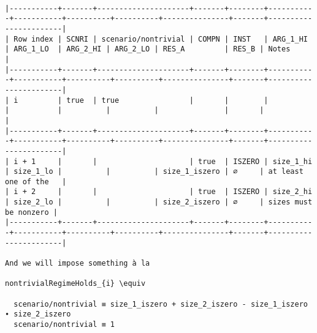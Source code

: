 \documentclass[varwidth=\maxdimen,margin=0.5cm,multi={verbatim}]{standalone}
\begin{document}
\begin{verbatim}

|-----------+-------+---------------------+-------+--------+-----------+-----------+----------+----------+---------------+-------+-----------------------|
| Row index | SCNRI | scenario/nontrivial | COMPN | INST   | ARG_1_HI  | ARG_1_LO  | ARG_2_HI | ARG_2_LO | RES_A         | RES_B | Notes                 |
|-----------+-------+---------------------+-------+--------+-----------+-----------+----------+----------+---------------+-------+-----------------------|
| i         | true  | true                |       |        |           |           |          |          |               |       |                       |
|-----------+-------+---------------------+-------+--------+-----------+-----------+----------+----------+---------------+-------+-----------------------|
| i + 1     |       |                     | true  | ISZERO | size_1_hi | size_1_lo |          |          | size_1_iszero | ∅     | at least one of the   |
| i + 2     |       |                     | true  | ISZERO | size_2_hi | size_2_lo |          |          | size_2_iszero | ∅     | sizes must be nonzero |
|-----------+-------+---------------------+-------+--------+-----------+-----------+----------+----------+---------------+-------+-----------------------|

And we will impose something à la

nontrivialRegimeHolds_{i} \equiv 

  scenario/nontrivial ≡ size_1_iszero + size_2_iszero - size_1_iszero ∙ size_2_iszero
  scenario/nontrivial ≡ 1

\end{verbatim}
\end{document}
